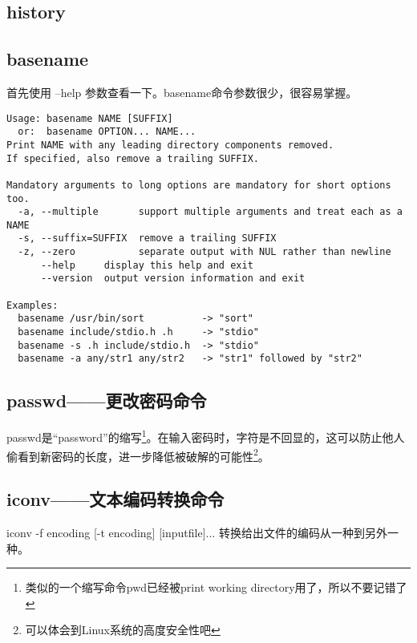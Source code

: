 \subsection{history}



\subsection{basename}
首先使用 --help 参数查看一下。basename命令参数很少，很容易掌握。
\begin{verbatim}
Usage: basename NAME [SUFFIX]
  or:  basename OPTION... NAME...
Print NAME with any leading directory components removed.
If specified, also remove a trailing SUFFIX.

Mandatory arguments to long options are mandatory for short options too.
  -a, --multiple       support multiple arguments and treat each as a NAME
  -s, --suffix=SUFFIX  remove a trailing SUFFIX
  -z, --zero           separate output with NUL rather than newline
      --help     display this help and exit
      --version  output version information and exit

Examples:
  basename /usr/bin/sort          -> "sort"
  basename include/stdio.h .h     -> "stdio"
  basename -s .h include/stdio.h  -> "stdio"
  basename -a any/str1 any/str2   -> "str1" followed by "str2"
\end{verbatim}




\subsection{passwd——更改密码命令}
passwd是“password”的缩写\footnote{类似的一个缩写命令pwd已经被print working directory用了，所以不要记错了}。在输入密码时，字符是不回显的，这可以防止他人偷看到新密码的长度，进一步降低被破解的可能性\footnote{可以体会到Linux系统的高度安全性吧}。


\subsection{iconv——文本编码转换命令}
iconv -f encoding [-t encoding] [inputfile]... 转换给出文件的编码从一种到另外一种。

